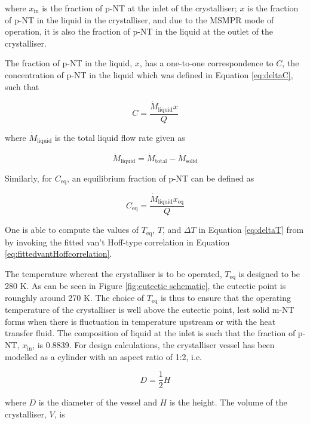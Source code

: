 \noindent where $x_{\mathrm{in}}$ is the fraction of p-NT at the inlet of the crystalliser; $x$ is the fraction of p-NT in the liquid in the crystalliser, and due to the MSMPR mode of operation, it is also the fraction of p-NT in the liquid at the outlet of the crystalliser.

The fraction of p-NT in the liquid, $x$, has a one-to-one correspondence to $C$, the concentration of p-NT in the liquid which was defined in Equation \ref{eq:deltaC}, such that 

\begin{equation}
    C = \frac{\dot{M}_{\mathrm{liquid}} x}{Q}
\end{equation}

\noindent where $\dot{M}_{\mathrm{liquid}}$ is the total liquid flow rate given as 

\begin{equation}
    \dot{M}_{\mathrm{liquid}} = \dot{M}_{\mathrm{total}} - \dot{M}_{\mathrm{solid}}
\end{equation}

\noindent Similarly, for $C_{\mathrm{eq}}$, an equilibrium fraction of p-NT can be defined as

\begin{equation}
    C_{\mathrm{eq}} = \frac{\dot{M}_{\mathrm{liquid}} x_{\mathrm{eq}}}{Q}
\end{equation}

\noindent One is able to compute the values of $T_{\mathrm{eq}}$, $T$, and $\Delta T$ in Equation \ref{eq:deltaT} from by invoking the fitted van't Hoff-type correlation in Equation \ref{eq:fittedvantHoffcorrelation}. 

The temperature whereat the crystalliser is to be operated, $T_{\mathrm{eq}}$ is designed to be 280 K. As can be seen in Figure \ref{fig:eutectic schematic}, the eutectic point is rounghly around 270 K. The choice of $T_{\mathrm{eq}}$ is thus to ensure that the operating temperature of the crystalliser is well above the eutectic point, lest solid m-NT forms when there is fluctuation in temperature upstream or with the heat transfer fluid. The composition of liquid at the inlet is such that the fraction of p-NT, $x_{\mathrm{in}}$, is 0.8839. For design calculations, the crystalliser vessel has been modelled as a cylinder with an aspect ratio of 1:2, i.e. 

\begin{equation}
    D = \frac{1}{2} H
\end{equation}

\noindent where $D$ is the diameter of the vessel and $H$ is the height. The volume of the crystalliser, $V$, is

